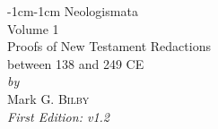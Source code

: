 %
\clearpage%
\null
\thispagestyle{empty}%
%
%
\begin{titlepage}
\begin{adjustwidth}{-1cm}{-1cm}%
\centering%
\vspace*{15mm} %
{\fontsize{44}{44}\selectfont Neologismata}\\ %
\vspace*{16mm} %
{\fontsize{24}{24}\selectfont Volume 1}\\ %
\vspace*{16mm} %
{\Large Proofs of New Testament Redactions \\[3mm] between 138 and 249 CE}\\ %
\vspace*{16mm} %
{\textit{by}}\\ %
\vspace*{16mm} %
{\Large Mark G. \textsc{Bilby}}\\%
\vspace*{24mm} %
{\textit{First Edition: v1.2}}\\ %
\end{adjustwidth}%
\end{titlepage}%
%
%
\thispagestyle{empty} %
